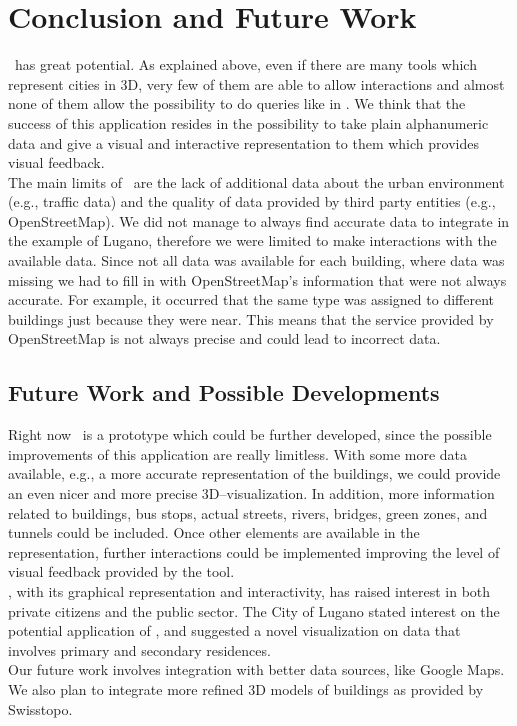\section{Conclusion and Future Work} \label{conclusions}
\applicationName\ has great potential. As explained above, even if there are many tools which represent cities in 3D, very few of them are able to allow interactions and almost none of them allow the possibility to do queries like in \applicationName. We think that the success of this application resides in the possibility to take plain alphanumeric data and give a visual and interactive representation to them which provides visual feedback.\\

The main limits of \applicationName\ are the lack of additional data about the urban environment (e.g., traffic data) and the quality of data provided by third party entities (e.g., OpenStreetMap). We did not manage to always find accurate data to integrate in the example of Lugano, therefore we were limited to make interactions with the available data. Since not all data was available for each building, where data was missing we had to fill in with OpenStreetMap's information that were not always accurate. For example, it occurred that the same type was assigned to different buildings just because they were near. This means that the service provided by OpenStreetMap is not always precise and could lead to incorrect data.

\subsection{Future Work and Possible Developments}
Right now \applicationName\ is a prototype which could be further developed, since the possible improvements of this application are really limitless. With some more data available, e.g., a more accurate representation of the buildings, we could provide an even nicer and more precise 3D--visualization. In addition, more information related to buildings, bus stops, actual streets, rivers, bridges, green zones, and tunnels could be included. Once other elements are available in the representation, further interactions could be implemented improving the level of visual feedback provided by the tool.\\

\applicationName, with its graphical representation and interactivity, has raised interest in both private citizens and the public sector. The City of Lugano stated interest on the potential application of \applicationName, and suggested a novel visualization on data that involves primary and secondary residences.\\

Our future work involves integration with better data sources, like Google Maps. We also plan to integrate more refined 3D models of buildings as provided by Swisstopo.
